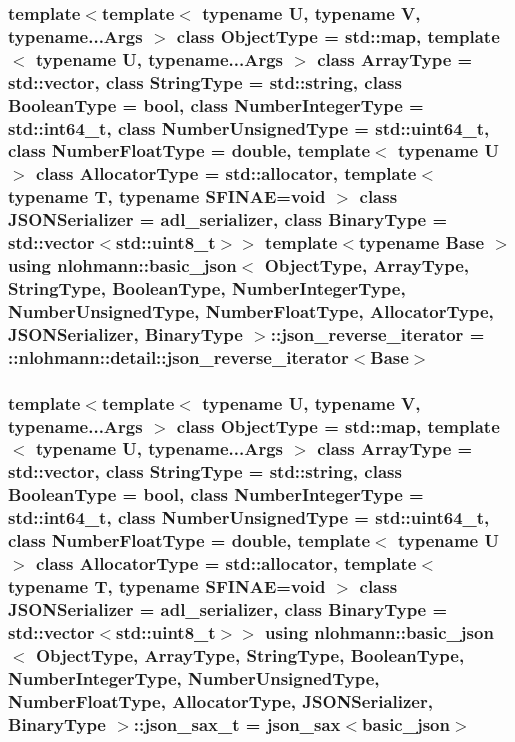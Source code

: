 \subsubsection[{\texorpdfstring{json\+\_\+reverse\+\_\+iterator}{json_reverse_iterator}}]{\setlength{\rightskip}{0pt plus 5cm}template$<$template$<$ typename U, typename V, typename...\+Args $>$ class Object\+Type = std\+::map, template$<$ typename U, typename...\+Args $>$ class Array\+Type = std\+::vector, class String\+Type  = std\+::string, class Boolean\+Type  = bool, class Number\+Integer\+Type  = std\+::int64\+\_\+t, class Number\+Unsigned\+Type  = std\+::uint64\+\_\+t, class Number\+Float\+Type  = double, template$<$ typename U $>$ class Allocator\+Type = std\+::allocator, template$<$ typename T, typename S\+F\+I\+N\+A\+E=void $>$ class J\+S\+O\+N\+Serializer = adl\+\_\+serializer, class Binary\+Type  = std\+::vector$<$std\+::uint8\+\_\+t$>$$>$ template$<$typename Base $>$ using {\bf nlohmann\+::basic\+\_\+json}$<$ Object\+Type, Array\+Type, String\+Type, Boolean\+Type, Number\+Integer\+Type, Number\+Unsigned\+Type, Number\+Float\+Type, Allocator\+Type, J\+S\+O\+N\+Serializer, Binary\+Type $>$\+::{\bf json\+\_\+reverse\+\_\+iterator} =  \+::{\bf nlohmann\+::detail\+::json\+\_\+reverse\+\_\+iterator}$<$Base$>$\hspace{0.3cm}{\ttfamily [private]}}\hypertarget{classnlohmann_1_1basic__json_a556d91bc2228135b27eb189e5a90ea4c}{}\label{classnlohmann_1_1basic__json_a556d91bc2228135b27eb189e5a90ea4c}
\subsubsection[{\texorpdfstring{json\+\_\+sax\+\_\+t}{json_sax_t}}]{\setlength{\rightskip}{0pt plus 5cm}template$<$template$<$ typename U, typename V, typename...\+Args $>$ class Object\+Type = std\+::map, template$<$ typename U, typename...\+Args $>$ class Array\+Type = std\+::vector, class String\+Type  = std\+::string, class Boolean\+Type  = bool, class Number\+Integer\+Type  = std\+::int64\+\_\+t, class Number\+Unsigned\+Type  = std\+::uint64\+\_\+t, class Number\+Float\+Type  = double, template$<$ typename U $>$ class Allocator\+Type = std\+::allocator, template$<$ typename T, typename S\+F\+I\+N\+A\+E=void $>$ class J\+S\+O\+N\+Serializer = adl\+\_\+serializer, class Binary\+Type  = std\+::vector$<$std\+::uint8\+\_\+t$>$$>$ using {\bf nlohmann\+::basic\+\_\+json}$<$ Object\+Type, Array\+Type, String\+Type, Boolean\+Type, Number\+Integer\+Type, Number\+Unsigned\+Type, Number\+Float\+Type, Allocator\+Type, J\+S\+O\+N\+Serializer, Binary\+Type $>$\+::{\bf json\+\_\+sax\+\_\+t} =  {\bf json\+\_\+sax}$<${\bf basic\+\_\+json}$>$}\hypertarget{classnlohmann_1_1basic__json_a164b1094a1a9feb54e400d8510bb0b12}{}\label{classnlohmann_1_1basic__json_a164b1094a1a9feb54e400d8510bb0b12}


